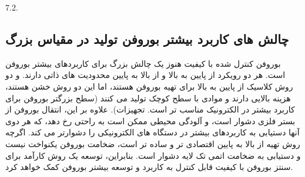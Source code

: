 7.2. \subsection{چالش های کاربرد بیشتر بوروفن تولید در مقیاس بزرگ} بوروفن کنترل شده با کیفیت هنوز یک چالش بزرگ برای کاربردهای بیشتر بوروفن است. هر دو رویکرد از پایین به بالا و از بالا به پایین محدودیت های ذاتی دارند.  و  دو روش کلاسیک از پایین به بالا برای تهیه بوروفن هستند، اما این دو روش خشن هستند، هزینه بالایی دارند و موادی با سطح کوچک تولید می کنند (سطح بزرگتر بوروفن برای کاربرد بیشتر در الکترونیک مناسب تر است. تجهیزات). علاوه بر این، انتقال بوروفن از بستر فلزی دشوار است، و آلودگی محیطی ممکن است به راحتی رخ دهد، که هر دوی آنها دستیابی به کاربردهای بیشتر در دستگاه های الکترونیکی را دشوارتر می کند. اگرچه روش تهیه از بالا به پایین اقتصادی تر و ساده تر است، ضخامت بوروفن یکنواخت نیست و دستیابی به ضخامت اتمی تک لایه دشوار است. بنابراین، توسعه یک روش کارآمد برای سنتز بوروفن با کیفیت قابل کنترل به کاربرد و توسعه بیشتر بوروفن کمک خواهد کرد.